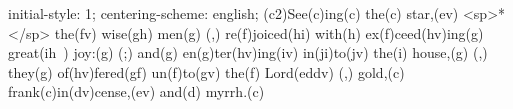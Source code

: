 initial-style: 1;
centering-scheme: english;
(c2)See(c)ing(c) the(c) star,(ev) <sp>*</sp> the(fv) wise(gh) men(g) (,) re(f)joiced(hi) with(h) ex(f)ceed(hv)ing(g) great(ih~) joy:(g) (;) and(g) en(g)ter(hv)ing(iv) in(ji)to(jv) the(i) house,(g) (,) they(g) of(hv)fered(gf) un(f)to(gv) the(f) Lord(eddv) (,) gold,(c) frank(c)in(dv)cense,(ev) and(d) myrrh.(c)
